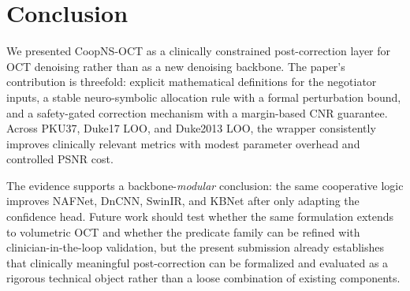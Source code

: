 \documentclass{ieeetj}
\begin{document}
\section{Conclusion}
\label{sec:conclusion}

We presented CoopNS-OCT as a clinically constrained post-correction layer for OCT denoising rather than as a new denoising backbone. The paper's contribution is threefold: explicit mathematical definitions for the negotiator inputs, a stable neuro-symbolic allocation rule with a formal perturbation bound, and a safety-gated correction mechanism with a margin-based CNR guarantee. Across PKU37, Duke17 LOO, and Duke2013 LOO, the wrapper consistently improves clinically relevant metrics with modest parameter overhead and controlled PSNR cost.

The evidence supports a backbone-\emph{modular} conclusion: the same cooperative logic improves NAFNet, DnCNN, SwinIR, and KBNet after only adapting the confidence head. Future work should test whether the same formulation extends to volumetric OCT and whether the predicate family can be refined with clinician-in-the-loop validation, but the present submission already establishes that clinically meaningful post-correction can be formalized and evaluated as a rigorous technical object rather than a loose combination of existing components.
\end{document}
